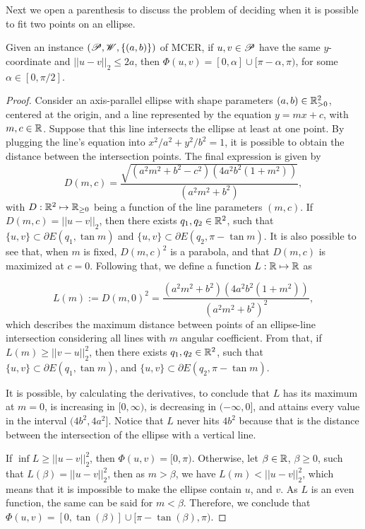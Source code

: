 Next we open a parenthesis to discuss the problem of deciding when it is possible to fit two points on an ellipse.

\begin{lem}\label{lema:l-function}
	Given an instance $(\mathscr{P}, \mathscr{W}, \{(a, b)\})$ of MCER, if $u, v \in \mathscr{P}$ have the same $y$-coordinate and $||u-v||_2 \le 2a$, then $\Phi(u,v) = [0, \alpha] \cup [\pi - \alpha, \pi)$, for some $\alpha \in [0, \pi/2]$.
\end{lem}

\begin{proof}
	
	Consider an axis-parallel ellipse with shape parameters $(a, b)\in\mathbb{R}^2_{>0}$, centered at the origin, and a line represented by the equation $y=mx+c$, with $m, c\in \mathbb{R}$. Suppose that this line intersects the ellipse at least at one point. By plugging the line's equation into $x^2/a^2+y^2/b^2=1$, it is possible to obtain the distance between the intersection points. The final expression is given by
	\begin{equation*}\label{eq:dist_line_ellipse}
	D(m, c)=\dfrac{\sqrt{(a^2m^2+b^2-c^2)(4a^2b^2(1+m^2))}}{(a^2m^2+b^2)},
	\end{equation*}
	with $D : \mathbb{R}^2 \mapsto \mathbb{R}_{\ge0}$ being a function of the line parameters $(m, c)$.
	If $D(m, c) = ||u-v||_2$, then there exists $q_1, q_2 \in \mathbb{R}^2$, such that $\{u, v\} \subset \partial E(q_1, \tan{m})$ and $\{u, v\} \subset \partial E(q_2, \pi-\tan{m})$. It is also possible to see that, when $m$ is fixed, $D(m, c)^2$ is a parabola, and that $D(m, c)$ is maximized at $c=0$.  
	Following that, we define a function $L:\mathbb{R}\mapsto\mathbb{R}$ as
	
	\begin{equation}\label{eq:function-l}
	L(m):= D(m, 0)^2 = \dfrac{(a^2m^2+b^2)(4a^2b^2(1+m^2))}{(a^2m^2+b^2)^2},
	\end{equation}
	which describes the maximum distance between points of an ellipse-line intersection considering all lines with $m$ angular coefficient. From that, if $L(m) \ge ||v-u||_2^2$, then there exists $q_1, q_2\in\mathbb{R}^2$, such that $\{u, v\} \subset \partial E(q_1, \tan{m})$, and $\{u, v\} \subset \partial E(q_2, \pi-\tan{m})$.
	
	It is possible, by calculating the derivatives, to conclude that $L$ has its maximum at $m=0$, is increasing in $[0, \infty)$, is decreasing in $(-\infty, 0]$, and attains every value in the interval $(4b^2, 4a^2]$. Notice that $L$ never hits $4b^2$ because that is the distance between the intersection of the ellipse with a vertical line.
	
	If $\inf{L} \ge ||u-v||_2^2$, then $\Phi(u,v) = [0, \pi)$.
	Otherwise, let $\beta \in \mathbb{R}$, $\beta \ge 0$, such that $L(\beta) = ||u-v||_2^2$, then as $m>\beta$, we have $L(m) < ||u-v||_2^2$, which means that it is impossible to make the ellipse contain $u$, and $v$.
	As $L$ is an even function, the same can be said for $m < \beta$. Therefore, we conclude that $\Phi(u,v)=[0, \tan(\beta)] \cup [\pi-\tan(\beta), \pi)$.
\end{proof}
